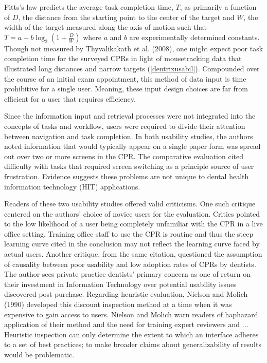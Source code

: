 \documentclass[11pt]{article}
\begin{document}
Fitts's law \cite{Fitts:1964vn,Fitts:2012kx} predicts the average task completion time, $T$, as primarily a function of $D$, the distance from the starting point to the center of the target and $W$, the width of the target measured along the axis of motion such that $ T = a + b \log_2 \left(1 + \frac{D}{W}\right) $ where $a$ and $b$ are experimentally determined constants. Though not measured by Thyvalikakath et al. (2008), one might expect poor task completion time for the surveyed CPRs in light of mousetracking data that illustrated long distances and narrow targets (\ref{dentrixusabil}). Compounded over the course of an initial exam appointment, this method of data input is time prohibitive for a single user. Meaning, these input design choices are far from efficient for a user that requires efficiency.

Since the information input and retrieval processes were not integrated into the concepts of tasks and workflow, users were required to divide their attention between navigation and task completion. In both usability studies, the authors noted information that would typically appear on a single paper form was spread out over two or more screens in the CPR. The comparative evaluation cited difficulty with tasks that required screen switching as a principle source of user frustration. Evidence suggests these problems are not unique to dental health information technology (HIT) applications\cite{Ash2004Some-unintended,Rose2005Using-qualitati}.

Readers of these two usability studies offered valid criticisms\cite{Cockerell:2009fk}. One such critique centered on the authors' choice of novice users for the evaluation. Critics pointed to the low likelihood of a user being completely unfamiliar with the CPR in a live office setting. Training office staff to use the CPR is routine and thus the steep learning curve cited in the conclusion may not reflect the learning curve faced by actual users. Another critique, from the same citation, questioned the assumption of causality between poor usability and low adoption rates of CPRs by dentists. The author sees private practice dentists' primary concern as one of return on their investment in Information Technology over potential usability issues discovered post purchase. Regarding heuristic evaluation, Nielson and Molich (1990) developed this discount inspection method at a time when it was expensive to gain access to users. Nielson and Molich warn readers of haphazard application of their method and the need for training expert reviewers and ... Heuristic inspection can only determine the extent to which an interface adheres to a set of best practices; to make broader claims about generalizability of results would be problematic.
\end{document}
